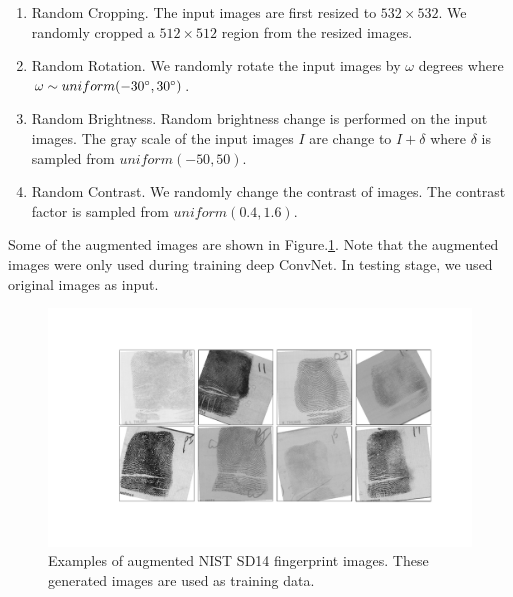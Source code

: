\begin{enumerate}

	\item Random Cropping. The input images are first resized to $532 \times 532$. We randomly cropped a $512\times512$ region from the resized images.
	\item Random Rotation. We randomly rotate the input images by $\omega$ degrees where $\omega \sim uniform (-30\degree, 30\degree)$.
	\item Random Brightness.  Random brightness change is performed on the input images. The gray scale of the input images $I$ are change to $I + \delta$ where $\delta$ is  sampled from $uniform (-50, 50)$.
	\item Random Contrast. We randomly change the contrast of images. The contrast factor is sampled from $uniform (0.4, 1.6)$.

\end{enumerate}
Some of the augmented images are shown in Figure.\ref{fig.augmented_examples}. Note that the augmented images were only used during training deep ConvNet.
%
In testing stage, we used original images as input.
\begin{figure}[!ht]
	\begin{center}
		\includegraphics[scale=0.33,clip=true,trim = 55mm 35mm 30mm 20mm]{fig/figs/augmented.pdf}
	\end{center}
	\caption{Examples of augmented NIST SD14 fingerprint images. These generated images are used as training data. } 
	\label{fig.augmented_examples}
\end{figure}

